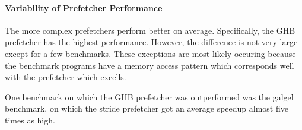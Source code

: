 
\paragraph{Variability of Prefetcher Performance}
\label{par:varprefperf}

The more complex prefetchers perform better on average. Specifically, the GHB
prefetcher has the highest performance. However, the difference is not
very large except for a few benchmarks. These exceptions are most
likely occuring because the benchmark programs have a memory access pattern
which corresponds well with the prefetcher which excells.


One benchmark on which the GHB prefetcher was outperformed was the
galgel benchmark, on which the stride prefetcher got an average
speedup almost five times as high. 




